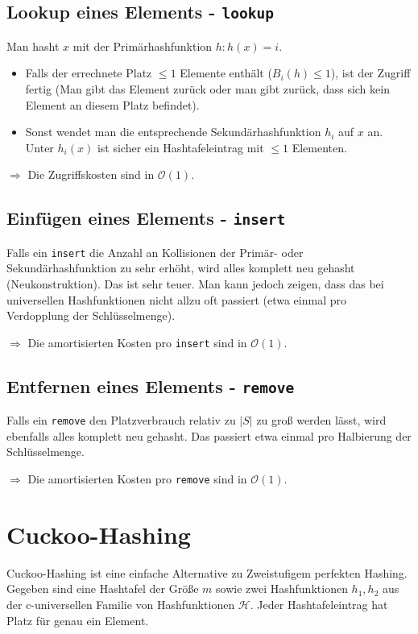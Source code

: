 \documentclass{scrartcl}%
\begin{document}
    \subsection*{Lookup eines Elements - \texttt{lookup}}
    Man hasht $x$ mit der Primärhashfunktion $h: h(x)=i$.
    \begin{itemize}
        \item Falls der errechnete Platz $\leq 1$ Elemente enthält ($B_i(h)\leq1$), ist der Zugriff fertig (Man gibt das Element zurück oder man gibt zurück, dass sich kein Element an diesem Platz befindet).
        \item Sonst wendet man die entsprechende Sekundärhashfunktion $h_i$ auf $x$ an. Unter $h_i(x)$ ist sicher ein Hashtafeleintrag mit $\leq1$ Elementen.
    \end{itemize}
    $\Rightarrow$ Die Zugriffskosten sind in $\mathcal{O}(1)$.

    \subsection*{Einfügen eines Elements - \texttt{insert}}
    Falls ein \texttt{insert} die Anzahl an Kollisionen der Primär- oder Sekundärhashfunktion zu sehr erhöht, wird alles komplett neu gehasht (Neukonstruktion).
    Das ist sehr teuer. Man kann jedoch zeigen, dass das bei universellen Hashfunktionen nicht allzu oft passiert (etwa einmal pro Verdopplung der Schlüsselmenge).

    $\Rightarrow$ Die amortisierten Kosten pro \texttt{insert} sind in $\mathcal{O}(1)$.

    \subsection*{Entfernen eines Elements - \texttt{remove}}
    Falls ein \texttt{remove} den Platzverbrauch relativ zu $|S|$ zu groß werden lässt, wird ebenfalls alles komplett neu gehasht. Das passiert etwa einmal pro Halbierung der Schlüsselmenge.

    $\Rightarrow$ Die amortisierten Kosten pro \texttt{remove} sind in $\mathcal{O}(1)$.

    \newpage
    \section*{Cuckoo-Hashing}
    Cuckoo-Hashing ist eine einfache Alternative zu Zweistufigem perfekten Hashing. Gegeben sind eine Hashtafel der Größe $m$
    sowie zwei Hashfunktionen $h_1,h_2$ aus der c-universellen Familie von Hashfunktionen $\mathcal{H}$.
    Jeder Hashtafeleintrag hat Platz für genau ein Element.
\end{document}
